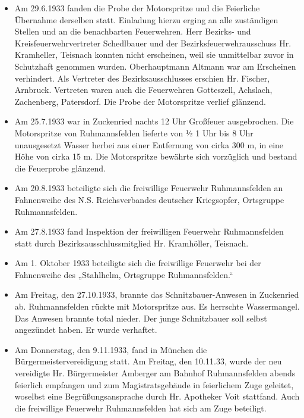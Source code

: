 \documentclass[12pt,a4paper]{book}
\begin{document}
\begin{itemize}
\item Am 29.6.1933 fanden die Probe der Motorspritze und die Feierliche
Übernahme derselben statt. Einladung hierzu erging an alle zuständigen Stellen
und an die benachbarten Feuerwehren. Herr Bezirks- und Kreisfeuerwehrvertreter
Schedlbauer und der Bezirksfeuerwehrausschuss Hr. Kramheller, Teisnach konnten
nicht erscheinen, weil sie unmittelbar zuvor in Schutzhaft genommen wurden.
Oberhauptmann Altmann war am Erscheinen verhindert. Als Vertreter des
Bezirksausschlusses erschien Hr. Fischer, Arnbruck. Vertreten waren auch die
Feuerwehren Gotteszell, Achslach, Zachenberg, Patersdorf. Die Probe der
Motorspritze verlief glänzend.

\item Am 25.7.1933 war in Zuckenried nachts 12 Uhr Großfeuer ausgebrochen. Die
Motorspritze von Ruhmannsfelden lieferte von ½ 1 Uhr bis 8 Uhr unausgesetzt
Wasser herbei aus einer Entfernung von cirka 300 m, in eine Höhe von cirka 15 m.
Die Motorspritze bewährte sich vorzüglich und bestand die Feuerprobe glänzend.

\item Am 20.8.1933 beteiligte sich die freiwillige Feuerwehr Ruhmannsfelden an
Fahnenweihe des N.S. Reichsverbandes deutscher Kriegsopfer, Ortsgruppe
Ruhmannsfelden.

\item Am 27.8.1933 fand Inspektion der freiwilligen Feuerwehr Ruhmannsfelden
statt durch Bezirksausschlussmitglied Hr. Kramhöller, Teisnach.

\item Am 1. Oktober 1933 beteiligte sich die freiwillige Feuerwehr bei der
Fahnenweihe des „Stahlhelm, Ortsgruppe Ruhmannsfelden.“

\item Am Freitag, den 27.10.1933, brannte das Schnitzbauer-Anwesen in Zuckenried
ab. Ruhmannsfelden rückte mit Motorspritze aus. Es herrschte Wassermangel. Das
Anwesen brannte total nieder. Der junge Schnitzbauer soll selbst angezündet
haben. Er wurde verhaftet.

\item Am Donnerstag, den 9.11.1933, fand in München die Bürgermeistervereidigung
statt. Am Freitag, den 10.11.33, wurde der neu vereidigte Hr. Bürgermeister
Amberger am Bahnhof Ruhmannsfelden abends feierlich empfangen und zum
Magistratsgebäude in feierlichem Zuge geleitet, woselbst eine
Begrüßungsansprache durch Hr. Apotheker Voit stattfand. Auch die freiwillige
Feuerwehr Ruhmannsfelden hat sich am Zuge beteiligt.
\end{itemize}
\end{document}
